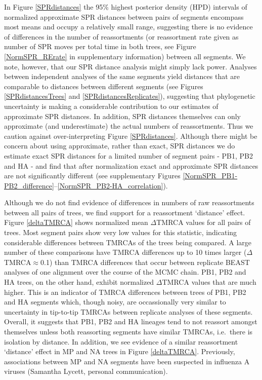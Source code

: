\documentclass[11pt,oneside,letterpaper]{article}
\begin{document}
In Figure \ref{SPRdistances} the 95\% highest posterior density (HPD) intervals of normalized approximate SPR distances between pairs of segments encompass most means and occupy a relatively small range, suggesting there is no evidence of differences in the number of reassortments (or reassortment rate given as number of SPR moves per total time in both trees, see Figure \ref{NormSPR_RErate} in supplementary information) between all segments.
We note, however, that our SPR distance analysis might simply lack power.
Analyses between independent analyses of the same segments yield distances that are comparable to distances between different segments (see Figures \ref{SPRdistancesTrees} and \ref{SPRdistancesReplicates}), suggesting that phylogenetic uncertainty is making a considerable contribution to our estimates of approximate SPR distances.
In addition, SPR distances themselves can only approximate (and underestimate) the actual numbers of reassortments.
Thus we caution against over-interpreting Figure \ref{SPRdistances}.
Although there might be concern about using approximate, rather than exact, SPR distances we do estimate exact SPR distances for a limited number of segment pairs - PB1, PB2 and HA - and find that after normalization exact and approximate SPR distances are not significantly different (see supplementary Figures \ref{NormSPR_PB1-PB2_difference}--\ref{NormSPR_PB2-HA_correlation}). 

Although we do not find evidence of differences in numbers of raw reassortments between all pairs of trees, we find support for a reassortment `distance' effect.
Figure \ref{deltaTMRCA} shows normalized mean $\Delta$TMRCA values for all pairs of trees.
Most segment pairs show very low values for this statistic, indicating considerable differences between TMRCAs of the trees being compared.
A large number of these comparisons have TMRCA differences up to 10 times larger ($\Delta$TMRCA$\approx$0.1) than TMRCA differences that occur between replicate BEAST analyses of one alignment over the course of the MCMC chain.
PB1, PB2 and HA trees, on the other hand, exhibit normalized $\Delta$TMRCA values that are much higher.
This is an indicator of TMRCA differences between trees of PB1, PB2 and HA segments which, though noisy, are occassionally very similar to uncertainty in tip-to-tip TMRCAs between replicate analyses of these segments.
Overall, it suggests that PB1, PB2 and HA lineages tend to not reassort amongst themselves unless both reassorting segments have similar TMRCAs, i.e.\ there is isolation by distance.
In addition, we see evidence of a similar reassortment `distance' effect in MP and NA trees in Figure \ref{deltaTMRCA}.
Previously, associations between MP and NA segments have been suspected in influenza A viruses (Samantha Lycett, personal communication).
\end{document}
